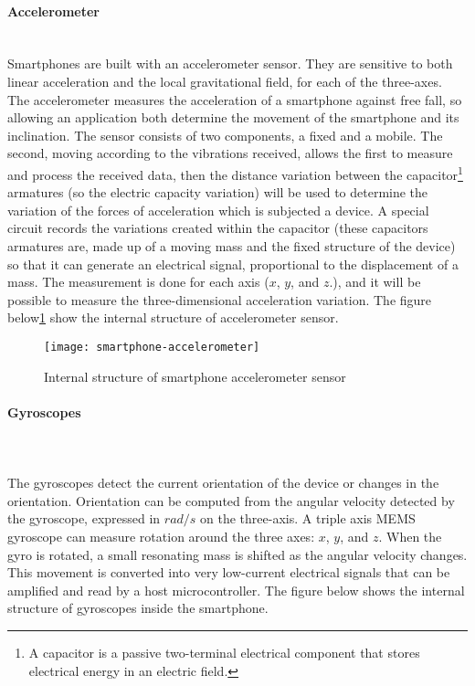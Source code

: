 \documentclass[tesi]{subfiles}
\begin{document}
\paragraph{{\Large Accelerometer}}\leavevmode\\
Smartphones are built with an accelerometer sensor. 
They are sensitive to both linear acceleration and the local gravitational field, for each of the three-axes. The accelerometer measures the acceleration of a smartphone against free fall, so allowing an application both determine the movement of the smartphone and its inclination.
The sensor consists of two components, a fixed and a mobile. 
The second, moving according to the vibrations received, allows the first to measure and process the received data, then the distance variation between the capacitor\footnote{A capacitor is a passive two-terminal electrical component that stores electrical energy in an electric field.} armatures (so the electric capacity variation) will be used to determine the variation of the forces of acceleration which is subjected a device. A special circuit records the variations created within the capacitor (these capacitors armatures are, made up of a moving mass and the fixed structure of the device) so that it can generate an electrical signal, proportional to the displacement of a mass.
The measurement is done for each axis ($x$, $y$, and $z$.), and it will be possible to measure the three-dimensional acceleration variation.
The figure below\ref{fig:Sample smartphone accelerometer sensors} show the internal structure of accelerometer sensor.
\vspace{1cm}
\begin{figure}[H]
\centering
\texttt{[image: smartphone-accelerometer]}
\caption{Internal structure of smartphone accelerometer sensor}
\label{fig:Sample smartphone accelerometer sensors}
\end{figure}

\paragraph{{\Large Gyroscopes}}\leavevmode\\\\
The gyroscopes detect the current orientation of the device or
changes in the orientation.
Orientation can be computed from the angular velocity detected by the gyroscope, expressed in $rad/s$ on the three-axis.  
A triple axis MEMS gyroscope can measure rotation around the three axes: $x$, $y$, and $z$.
When the gyro is rotated, a small resonating mass is shifted as the angular velocity changes. This movement is converted into very low-current electrical signals that can be amplified and read by a host microcontroller.
The figure below shows the internal structure of gyroscopes inside the smartphone.
\end{document}
